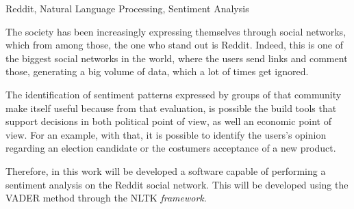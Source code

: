 \documentclass{iiufrgs}
\begin{document}
\begin{englishabstract}{}{Reddit, Natural Language Processing, Sentiment
Analysis}

The society has been increasingly expressing themselves through social networks,
which from among those, the one who stand out is Reddit. Indeed, this is one of
the biggest social networks in the world, where the users send links and comment
those, generating a big volume of data, which a lot of times get ignored.

The identification of sentiment patterns expressed by groups of that community
make itself useful because from that evaluation, is possible the build tools
that support decisions in both political point of view, as well an economic
point of view. For an example, with that, it is possible to identify the users's
opinion regarding an election candidate or the costumers acceptance of a new
product.

Therefore, in this work will be developed a software capable of performing a
sentiment analysis on the Reddit social network. This will be developed using
the \ac{VADER} method through the \ac{NLTK} \textit{framework}.

\end{englishabstract}

\acresetall



%

%
% 
% 
% 



\end{document}
